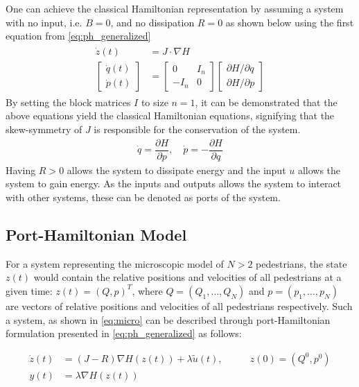 One can achieve the classical Hamiltonian representation by assuming a system with no input, i.e. $B = 0$, and  no dissipation $R = 0$ as shown below using the first equation from \autoref{eq:ph_generalized}
\begin{gather*}
    \begin{aligned}
    \dot z(t) &= J \cdot \nabla H \\
    \begin{bmatrix}
        \dot q(t) \\ \dot p(t)
    \end{bmatrix}
    &=
    \begin{bmatrix}
        0 & I_n \\ 
        -I_n & 0
    \end{bmatrix}
    \begin{bmatrix}
        \partial H / \partial q \\
        \partial H / \partial p
    \end{bmatrix} 
    \end{aligned}
\end{gather*}
By setting the block matrices $I$ to size $n=1$, it can be demonstrated that the above equations yield the classical Hamiltonian equations, signifying that the skew-symmetry of $J$ is responsible for the conservation of the system.
\begin{align*}
\dot q = \dfrac{\partial H}{\partial p}, \quad \dot p = -\dfrac{\partial H}{\partial q}
\end{align*}
Having $R > 0$ allows the system to dissipate energy and the input $u$ allows the system to gain energy. As the inputs and outputs allows the system to interact with other systems, these can be denoted as ports of the system.

\subsection{Port-Hamiltonian Model}
For a system representing the microscopic model of $N > 2$ pedestrians, the state $z(t)$ would contain the relative positions and velocities of all pedestrians at a given time: $z(t) = (Q,p)^T$, where $Q = (Q_1,\dots,Q_N)$ and $p = (p_1,\dots,p_N)$ are vectors of relative positions and velocities of all pedestrians respectively. Such a system, as shown in \autoref{eq:micro} can be described through port-Hamiltonian formulation presented in \autoref{eq:ph_generalized} as follows:

\begin{equation}
    \begin{aligned}
        \dot z(t) &= (J-R)\nabla H(z(t)) + \lambda \tilde u(t), &\qquad z(0) = (Q^0,p^0)\\
        y(t) &= \lambda \nabla H(z(t)) 
    \end{aligned}
    \label{eq:ph_model}
\end{equation}

